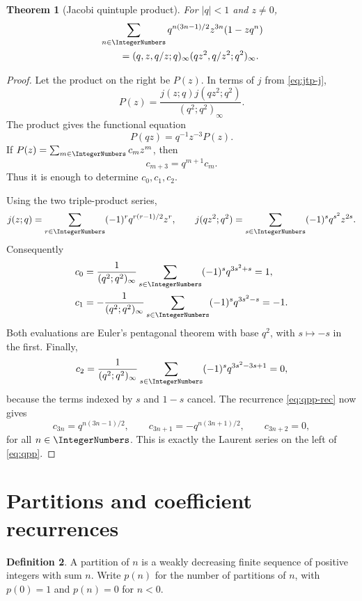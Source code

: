 \documentclass[11pt]{article}
\numberwithin{equation}{section}
\newtheorem{theorem}{Theorem}[section]
\theoremstyle{definition}
\newtheorem{definition}[theorem]{Definition}
\theoremstyle{remark}
\begin{document}
\begin{theorem}[Jacobi quintuple product]\label{thm:qpp}
For $|q|<1$ and $z\ne0$,
\begin{align}
&\sum_{n\in\IntegerNumbers}q^{n(3n-1)/2}z^{3n}(1-zq^n)\label{eq:qpp}\\
&\qquad=(q,z,q/z;q)_\infty
(qz^2,q/z^2;q^2)_\infty.\notag
\end{align}
\end{theorem}
\begin{proof}
Let the product on the right be $P(z)$.  In terms of $j$ from
\eqref{eq:jtp-j},
\[
P(z)=\frac{j(z;q)j(qz^2;q^2)}{(q^2;q^2)_\infty}.
\]
The product gives the functional equation
\[
P(qz)=q^{-1}z^{-3}P(z).
\]
If $P(z)=\sum_{m\in\IntegerNumbers}c_mz^m$, then
\begin{equation}\label{eq:qpp-rec}
c_{m+3}=q^{m+1}c_m.
\end{equation}
Thus it is enough to determine $c_0,c_1,c_2$.

Using the two triple-product series,
\[
j(z;q)=\sum_{r\in\IntegerNumbers}(-1)^rq^{r(r-1)/2}z^r,
\qquad
j(qz^2;q^2)=\sum_{s\in\IntegerNumbers}(-1)^sq^{s^2}z^{2s}.
\]
Consequently
\begin{align*}
c_0&=\frac1{(q^2;q^2)_\infty}
 \sum_{s\in\IntegerNumbers}(-1)^sq^{3s^2+s}=1,\\
c_1&=-\frac1{(q^2;q^2)_\infty}
 \sum_{s\in\IntegerNumbers}(-1)^sq^{3s^2-s}=-1.
\end{align*}
Both evaluations are Euler's pentagonal theorem with base $q^2$, with
$s\mapsto-s$ in the first.  Finally,
\[
c_2=\frac1{(q^2;q^2)_\infty}
 \sum_{s\in\IntegerNumbers}(-1)^sq^{3s^2-3s+1}=0,
\]
because the terms indexed by $s$ and $1-s$ cancel.  The recurrence
\eqref{eq:qpp-rec} now gives
\[
c_{3n}=q^{n(3n-1)/2},\qquad
c_{3n+1}=-q^{n(3n+1)/2},\qquad c_{3n+2}=0,
\]
for all $n\in\IntegerNumbers$.  This is exactly the Laurent series on the left of
\eqref{eq:qpp}.
\end{proof}

\section{Partitions and coefficient recurrences}

\begin{definition}
A partition of $n$ is a weakly decreasing finite sequence of positive
integers with sum $n$.  Write $p(n)$ for the number of partitions of $n$, with
$p(0)=1$ and $p(n)=0$ for $n<0$.
\end{definition}
\end{document}
